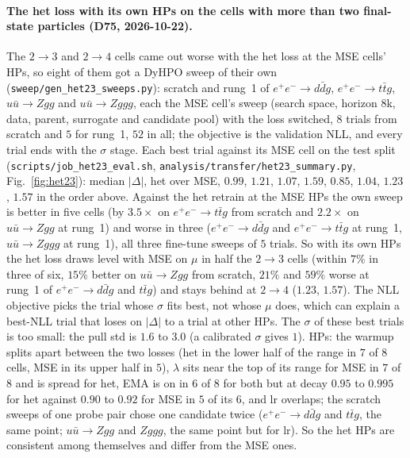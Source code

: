 \documentclass[11pt]{article}
\newcommand{\code}[1]{\texttt{#1}}
\begin{document}
\paragraph{The het loss with its own HPs on the cells with more than two final-state particles (D75, 2026-10-22).}
The $2\to3$ and $2\to4$ cells came out worse with the het loss at the MSE cells' HPs, so eight of them got a DyHPO
sweep of their own (\code{sweep/gen\_het23\_sweeps.py}): scratch and rung~1 of $e^+e^-\to d\bar dg$, $e^+e^-\to t\bar
tg$, $u\bar u\to Zgg$ and $u\bar u\to Zggg$, each the MSE cell's sweep (search space, horizon $8$k, data, parent,
surrogate and candidate pool) with the loss switched, $8$ trials from scratch and $5$ for rung~1, $52$ in all; the
objective is the validation NLL, and every trial ends with the $\sigma$ stage. Each best trial against its MSE cell
on the test split (\code{scripts/job\_het23\_eval.sh}, \code{analysis/transfer/het23\_summary.py},
Fig.~\ref{fig:het23}): median $|\Delta|$, het over MSE, $0.99$, $1.21$, $1.07$, $1.59$, $0.85$, $1.04$, $1.23$, $1.57$ in
the order above. Against the het retrain at the MSE HPs the own sweep is better in five cells (by $3.5\times$ on
$e^+e^-\to t\bar tg$ from scratch and $2.2\times$ on $u\bar u\to Zgg$ at rung~1) and worse in three ($e^+e^-\to d\bar dg$
and $e^+e^-\to t\bar tg$ at rung~1, $u\bar u\to Zggg$ at rung~1), all three fine-tune sweeps of $5$ trials. So with its
own HPs the het loss draws level with MSE on $\mu$ in half the $2\to3$ cells (within $7\%$ in three of six, $15\%$
better on $u\bar u\to Zgg$ from scratch, $21\%$ and $59\%$ worse at rung~1 of $e^+e^-\to d\bar dg$ and $t\bar tg$) and
stays behind at $2\to4$ ($1.23$, $1.57$). The NLL objective picks the trial whose $\sigma$
fits best, not whose $\mu$ does, which can explain a best-NLL trial that loses on $|\Delta|$ to a trial at other HPs.
The $\sigma$ of these best trials is too small: the pull std is $1.6$ to $3.0$ (a calibrated $\sigma$ gives $1$).
HPs: the warmup splits apart between the two losses (het in the lower half of the range in $7$ of $8$ cells, MSE in
its upper half in $5$), $\lambda$ sits near the top of its range for MSE in $7$ of $8$ and is spread for het, EMA is on in $6$
of $8$ for both but at decay $0.95$ to $0.995$ for het against $0.90$ to $0.92$ for MSE in $5$ of its $6$, and lr
overlaps; the scratch sweeps of
one probe pair chose one candidate twice ($e^+e^-\to d\bar dg$ and $t\bar tg$, the same point; $u\bar u\to Zgg$ and
$Zggg$, the same point but for lr). So the het HPs are consistent among themselves and differ from the MSE ones.
\end{document}
